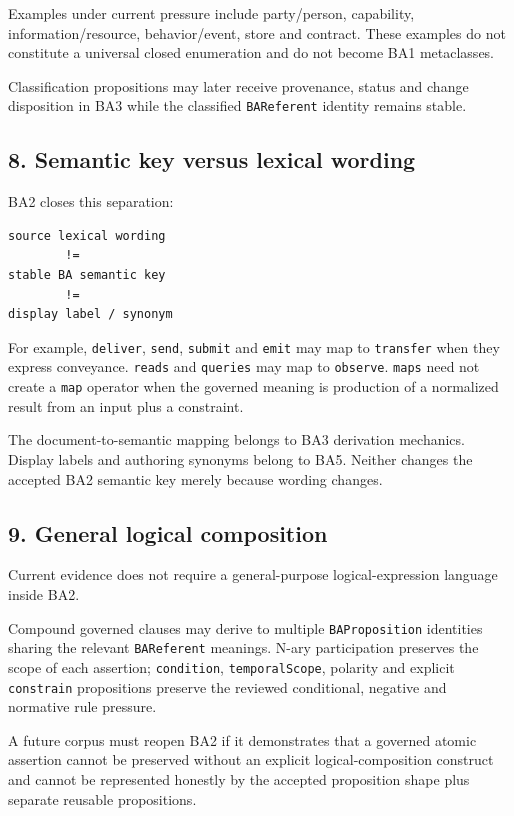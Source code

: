 \documentclass[11pt,a4paper]{article}
\begin{document}
Examples under current pressure include party/person, capability, information/resource, behavior/event, store and contract. These examples do not constitute a universal closed enumeration and do not become BA1 metaclasses.

Classification propositions may later receive provenance, status and change disposition in BA3 while the classified \texttt{BAReferent} identity remains stable.

\subsection{8. Semantic key versus lexical wording}\label{semantic-key-versus-lexical-wording}

BA2 closes this separation:

\begin{verbatim}
source lexical wording
        !=
stable BA semantic key
        !=
display label / synonym
\end{verbatim}

For example, \texttt{deliver}, \texttt{send}, \texttt{submit} and \texttt{emit} may map to \texttt{transfer} when they express conveyance. \texttt{reads} and \texttt{queries} may map to \texttt{observe}. \texttt{maps} need not create a \texttt{map} operator when the governed meaning is production of a normalized result from an input plus a constraint.

The document-to-semantic mapping belongs to BA3 derivation mechanics. Display labels and authoring synonyms belong to BA5. Neither changes the accepted BA2 semantic key merely because wording changes.

\subsection{9. General logical composition}\label{general-logical-composition}

Current evidence does not require a general-purpose logical-expression language inside BA2.

Compound governed clauses may derive to multiple \texttt{BAProposition} identities sharing the relevant \texttt{BAReferent} meanings. N-ary participation preserves the scope of each assertion; \texttt{condition}, \texttt{temporalScope}, polarity and explicit \texttt{constrain} propositions preserve the reviewed conditional, negative and normative rule pressure.

A future corpus must reopen BA2 if it demonstrates that a governed atomic assertion cannot be preserved without an explicit logical-composition construct and cannot be represented honestly by the accepted proposition shape plus separate reusable propositions.
\end{document}

